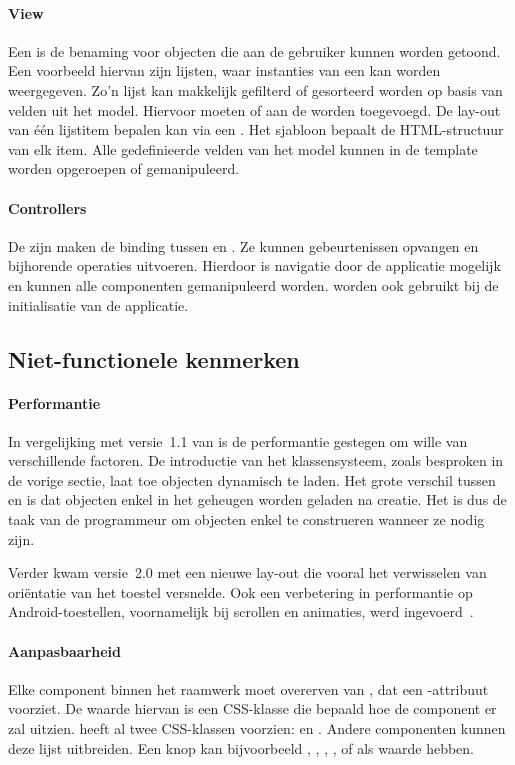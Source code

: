 \paragraph{View}
Een  is de benaming voor objecten die aan de gebruiker kunnen worden getoond.  
Een voorbeeld hiervan zijn lijsten,  waar instanties van een  kan worden weergegeven.  
Zo'n lijst kan makkelijk gefilterd of gesorteerd worden op basis van velden uit het model.
Hiervoor moeten  of  aan de  worden toegevoegd. 
De lay-out van één lijstitem bepalen kan via een .  
Het sjabloon bepaalt de HTML-structuur van elk item.  
Alle gedefinieerde velden van het model kunnen in de template worden opgeroepen of gemanipuleerd.

\paragraph{Controllers} 
De  zijn maken de binding tussen  en .
Ze kunnen gebeurtenissen opvangen en bijhorende operaties uitvoeren.
Hierdoor is navigatie door de applicatie mogelijk en kunnen alle componenten gemanipuleerd worden.
 worden ook gebruikt bij de initialisatie van de applicatie.

\subsection{Niet-functionele kenmerken}
\paragraph{Performantie}
In vergelijking met versie~1.1 van \st{} is de performantie gestegen om wille van verschillende factoren.  
De introductie van het klassensysteem,  zoals besproken in de vorige sectie,  laat toe objecten dynamisch te laden. 
Het grote verschil tussen  en  is dat objecten enkel in het geheugen worden geladen na creatie.  
Het is dus de taak van de programmeur om objecten enkel te construeren wanneer ze nodig zijn.

Verder kwam versie~2.0 met een nieuwe lay-out  die vooral het verwisselen van oriëntatie van het toestel versnelde.  
Ook een verbetering in performantie op Android-toestellen,  voornamelijk bij scrollen en animaties,  werd ingevoerd~\cite{Inc.}.

\paragraph{Aanpasbaarheid}
\label{sec:sencha-aanpasbaarheid}
Elke component binnen het raamwerk moet overerven van , dat een -attribuut voorziet.  
De waarde hiervan is een CSS-klasse die bepaald hoe de component er zal uitzien.  
\st{} heeft al twee CSS-klassen voorzien:   en .  
Andere componenten kunnen deze lijst uitbreiden.  
Een knop kan bijvoorbeeld ,  ,  ,  ,   of  als  waarde hebben.

